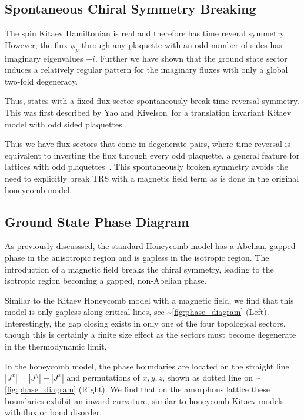 \hypertarget{spontaneous-chiral-symmetry-breaking}{%
\subsection{Spontaneous Chiral Symmetry Breaking}\label{spontaneous-chiral-symmetry-breaking}}

The spin Kitaev Hamiltonian is real and therefore has time reveral symmetry. However, the flux \(\phi_p\) through any plaquette with an odd number of sides has imaginary eigenvalues \(\pm i\). Further we have shown that the ground state sector induces a relatively regular pattern for the imaginary fluxes with only a global two-fold degeneracy.

Thus, states with a fixed flux sector spontaneously break time reversal symmetry. This was first described by Yao and Kivelson~for a translation invariant Kitaev model with odd sided plaquettes \autocite{Yao2011}.

Thus we have flux sectors that come in degenerate pairs, where time reversal is equivalent to inverting the flux through every odd plaquette, a general feature for lattices with odd plaquettes~\autocite{yaoExactChiralSpin2007,Peri2020}. This spontaneously broken symmetry avoids the need to explicitly break TRS with a magnetic field term as is done in the original honeycomb model.

\hypertarget{ground-state-phase-diagram}{%
\subsection{Ground State Phase Diagram}\label{ground-state-phase-diagram}}

As previously discusssed, the standard Honeycomb model has a Abelian, gapped phase in the anisotropic region and is gapless in the isotropic region. The introduction of a magnetic field breaks the chiral symmetry, leading to the isotropic region becoming a gapped, non-Abelian phase.

Similar to the Kitaev Honeycomb model with a magnetic field, we find that this model is only gapless along critical lines, see \textasciitilde{}\ref{fig:phase_diagram} (Left). Interestingly, the gap closing exists in only one of the four topological sectors, though this is certainly a finite size effect as the sectors must become degenerate in the thermodynamic limit.

In the honeycomb model, the phase boundaries are located on the straight line \(|J^x| = |J^y| + |J^x|\) and permutations of \(x,y,z\), shown as dotted line on \textasciitilde{}\ref{fig:phase_diagram} (Right). We find that on the amorphous lattice these boundaries exhibit an inward curvature, similar to honeycomb Kitaev models with flux \autocite{Nasu_Thermal_2015} or bond \autocite{knolle_dynamics_2016} disorder.

